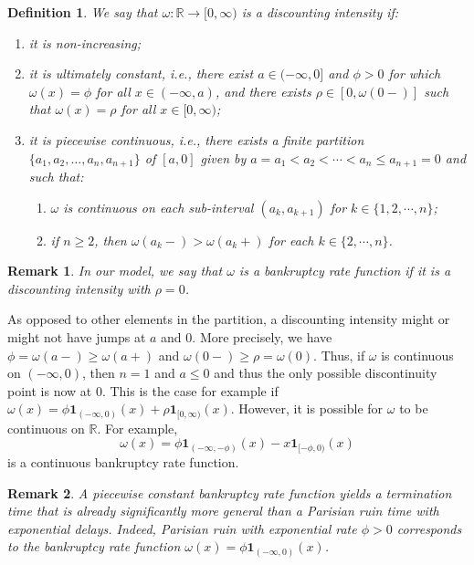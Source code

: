 \documentclass[11pt,reqno]{amsart}
\newtheorem{remark}{Remark}[section]
\newtheorem{definition}{Definition}[section]
\newcommand{\reals}{\mathbb{R}}
\newcommand{\ind}{\mathbf{1}}
\renewcommand{\leq}{\leqslant}
\renewcommand{\geq}{\geqslant}
\begin{document}
\begin{definition}\label{def:bankruptcy-rate-function}
	We say that $\omega \colon \reals \to [0,\infty)$ is a discounting intensity if:
	\begin{enumerate}
		\item it is non-increasing;
		\item it is \textit{ultimately constant}, i.e., there exist $a \in (-\infty,0]$ and $\phi > 0$ for which $\omega(x)=\phi$ for all $x \in (-\infty,a)$, and there exists $\rho \in [0, \omega(0-)]$ such that $\omega(x)=\rho$ for all $x \in [0,\infty)$;
		\item it is piecewise continuous, i.e., there exists a finite partition $\{a_1, a_2, \dots, a_n, a_{n+1}\}$ of $[a,0]$ given by $a = a_1 < a_2 < \cdots < a_n \leq a_{n+1} = 0$ and such that:
		\begin{enumerate}
			\item $\omega$ is continuous on each sub-interval $(a_k,a_{k+1})$ for $k \in \lbrace 1,2,\cdots,n \rbrace$;
			\item if $n \geq 2$, then $\omega(a_k-)>\omega(a_k+)$ for each $k \in \lbrace 2,\cdots,n \rbrace$.
		\end{enumerate}
	\end{enumerate}
\end{definition}
\begin{remark}
	In our model, we say that $\omega$ is a bankruptcy rate function if it is a discounting intensity with $\rho=0$.
\end{remark}

As opposed to other elements in the partition, a discounting intensity might or might not have jumps at $a$ and $0$. More precisely, we have $\phi=\omega(a-) \geq \omega(a+)$ and $\omega(0-) \geq \rho=\omega(0)$. Thus, if $\omega$ is continuous on $(-\infty,0)$, then $n=1$ and $a \leq 0$ and thus the only possible discontinuity point is now at $0$. This is the case for example if $\omega(x) = \phi \ind_{(-\infty,0)} (x) + \rho \ind_{[0,\infty)}(x)$. However, it is possible for $\omega$ to be continuous on $\reals$. For example,
\[
\omega(x) = \phi \ind_{(-\infty,-\phi)}(x) - x \ind_{[-\phi,0)}(x)
\]
is a continuous bankruptcy rate function.%

\begin{remark}
A piecewise constant bankruptcy rate function yields a termination time that is already significantly more general than a Parisian ruin time with exponential delays. Indeed, Parisian ruin with exponential rate $\phi>0$ corresponds to the bankruptcy rate function $\omega(x) = \phi \ind_{(-\infty,0)}(x)$.
\end{remark}
\end{document}
